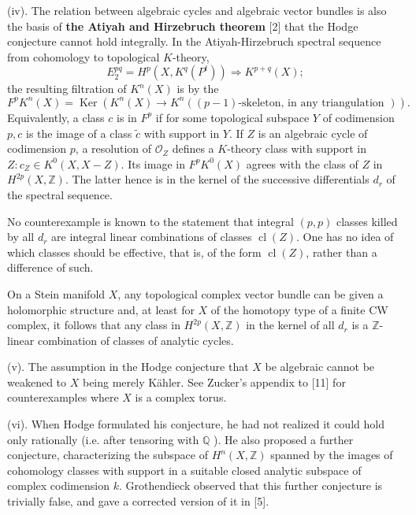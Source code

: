 \documentclass[12pt,twoside]{book}
\theoremstyle{plain}
\theoremstyle{definition}
\theoremstyle{remark}
\numberwithin{equation}{section}
\begin{document}
(iv).  The relation between algebraic cycles and algebraic vector bundles is also the basis of \textbf{the Atiyah and Hirzebruch theorem} [2] that the Hodge conjecture cannot hold integrally. In the Atiyah-Hirzebruch spectral sequence from cohomology to topological $K$-theory,
$$
E_2^{p q}=H^p\left(X, K^q\left(P^t\right)\right) \Longrightarrow K^{p+q}(X) ;
$$
the resulting filtration of $K^n(X)$ is by the
$$
F^p K^n(X)=\operatorname{Ker}\left(K^n(X) \rightarrow K^n((p-1) \text {-skeleton, in any triangulation })\right) .
$$
Equivalently, a class $c$ is in $F^p$ if for some topological subspace $Y$ of codimension $p, c$ is the image of a class $\tilde{c}$ with support in $Y$. If $Z$ is an algebraic cycle of codimension $p$, a resolution of $\mathcal{O}_Z$ defines a $K$-theory class with support in $Z: c_Z \in K^0(X, X-Z)$. Its image in $F^p K^0(X)$ agrees with the class of $Z$ in $H^{2 p}(X, \mathbb{Z})$. The latter hence is in the kernel of the successive differentials $d_r$ of the spectral sequence.

No counterexample is known to the statement that integral $(p, p)$ classes killed by all $d_r$ are integral linear combinations of classes $\operatorname{cl}(Z)$. One has no idea of which classes should be effective, that is, of the form $\operatorname{cl}(Z)$, rather than a difference of such.

On a Stein manifold $X$, any topological complex vector bundle can be given a holomorphic structure and, at least for $X$ of the homotopy type of a finite CW
complex, it follows that any class in $H^{2 p}(X, \mathbb{Z})$ in the kernel of all $d_r$ is a $\mathbb{Z}$-linear combination of classes of analytic cycles.

(v).  The assumption in the Hodge conjecture that $X$ be algebraic cannot be weakened to $X$ being merely Kähler. See Zucker's appendix to [11] for counterexamples where $X$ is a complex torus.

(vi).  When Hodge formulated his conjecture, he had not realized it could hold only rationally (i.e. after tensoring with $\mathbb{Q}$ ). He also proposed a further conjecture, characterizing the subspace of $H^n(X, \mathbb{Z})$ spanned by the images of cohomology classes with support in a suitable closed analytic subspace of complex codimension $k$. Grothendieck observed that this further conjecture is trivially false, and gave a corrected version of it in [5].
\end{document}
